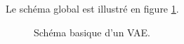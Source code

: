 \begin{appendices}
Le schéma global est illustré en figure \ref{fig:vae_scheme}.
\begin{figure}[!htbp]
\center
\caption{Schéma basique d'un VAE.}
\label{fig:vae_scheme}
\end{figure}
\FloatBarrier

\end{appendices}

\clearpage

